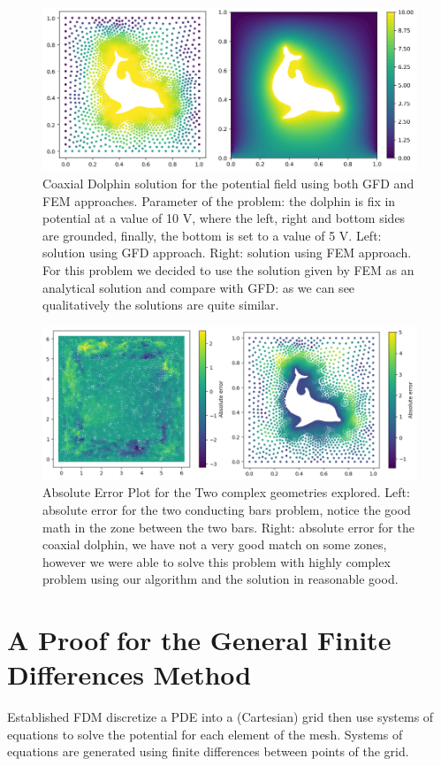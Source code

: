 \documentclass{PoS}
\begin{document}
\begin{figure}
\begin{center}
\includegraphics[width=.95\textwidth]{Figures/FEM/Dolfin_GFD&FEM.png}
\caption{Coaxial Dolphin solution for the potential field using both GFD and FEM approaches. Parameter of the problem: the dolphin is fix in potential at a value of 10 V, where the left, right and bottom sides are grounded, finally, the bottom is set to a value of 5 V. Left: solution using GFD approach. Right: solution using FEM approach. For this problem we decided to use the solution given by FEM as an analytical solution and compare with GFD: as we can see qualitatively the solutions are quite similar.}
\label{fig:VE_Dolphin}
\end{center}
\end{figure}
\begin{figure}
    \centering
    \includegraphics[width = 0.99\linewidth]{Figures/FEM/Errors.png}
    \caption{Absolute Error Plot for the Two complex geometries explored. Left: absolute error for the two conducting bars problem, notice the good math in the zone between the two bars. Right: absolute error for the coaxial dolphin, we have not a very good match on some zones, however we were able to solve this problem with highly complex problem using our algorithm and the solution in reasonable good.}
    \label{fig:Errors}
\end{figure}

\FloatBarrier
\section{A Proof for the General Finite Differences Method}
\label{sec:gfdm_math}
Established FDM discretize a PDE into a (Cartesian) grid then use systems of equations to solve the potential for each element of the mesh. Systems of equations are generated using finite differences between points of the grid.
\end{document}
